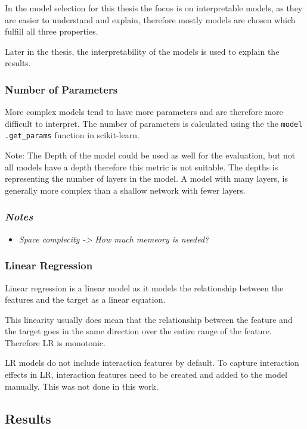 In the model selection for this thesis the focus is on interpretable models,
as they are easier to
understand and explain, therefore mostly models are chosen which fulfill all
three
properties.

Later in the thesis, the interpretability of the models is used to explain
the results.

\subsubsection*{Number of Parameters}
More complex models tend to have more parameters and are therefore more
difficult to interpret.
The number of parameters is calculated using the the \texttt{model
.get\_params} function
in scikit-learn.

Note: The Depth of the model could be used as well for the evaluation, but
not all models have a
depth therefore this metric is not suitable.
The depths is representing the number of layers in the model.
A model with many layers, is generally more complex than a shallow network
with fewer layers.

\subsubsection*{\textit{Notes}}

\begin{itemize}
\item \textit{Space complecity -> How much memeory is needed?}
\end{itemize}

\subsubsection*{Linear Regression}
Linear regression is a linear model as it models the relationship between the
features and the
target as a linear equation.

This linearity usually does mean that the relationship between the feature
and the target goes in
the same direction over the entire range of the feature. Therefore \ac{LR} is
monotonic.

\ac{LR} models do not include interaction features by default.
To capture interaction effects in \ac{LR}, interaction features need to be
created and added to
the model manually. This was not done in this work.

\subsection{Results}\label{subsec:results2}

